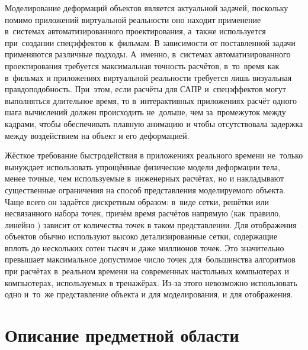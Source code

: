 \documentclass[a4paper, 14pt, titlepage]{extarticle}
\let\oldsection\section
\renewcommand{\section}{\newpage\oldsection}
\begin{document}
    Моделирование деформаций объектов является актуальной задачей, поскольку помимо приложений
    виртуальной реальности оно находит применение в~системах автоматизированного проектирования, а~также используется
    при~создании спецэффектов к~фильмам. В зависимости от поставленной задачи применяются различные
    подходы. А~именно, в~системах автоматизированного проектирования требуется
    максимальная точность расчётов, в~то~время как в~фильмах и приложениях виртуальной реальности
    требуется лишь визуальная правдоподобность. При~этом, если расчёты для САПР и~спецэффектов могут
    выполняться длительное время, то в~интерактивных приложениях расчёт одного шага вычислений должен
    происходить не~дольше, чем за~промежуток между кадрами, чтобы обеспечивать плавную анимацию
    и чтобы отсутствовала задержка между воздействием на объект и его деформацией.

    Жёсткое требование быстродействия в приложениях реального времени не~только вынуждает
    использовать упрощённые физические модели деформации тела, менее точные, чем используемые
    в~инженерных расчётах, но и накладывают существенные ограничения на способ представления
    моделируемого объекта. Чаще всего он задаётся дискретным образом: в~виде сетки, решётки или
    несвязанного набора точек, причём время расчётов напрямую (как~правило, линейно
    \cite{mueller-meshless}) зависит от количества точек в таком представлении. Для отображения
    объектов обычно используют высоко детализированные сетки, содержащие вплоть до нескольких
    сотен тысяч и даже миллионов точек. Это значительно превышает максимальное допустимое число точек для~большинства
    алгоритмов \cite{mueller-stable, mueller-meshless, chang-crash} при расчётах в~реальном времени на
    современных настольных компьютерах и компьютерах, используемых в тренажёрах. Из-за этого
    невозможно использовать одно и~то~же представление объекта и для моделирования, и для
    отображения.

  \section{Описание предметной области}\label{sec:domain}
\end{document}

